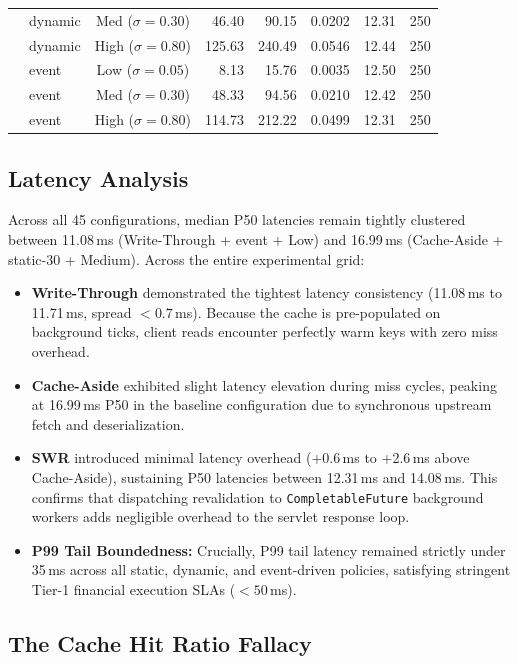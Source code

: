 \documentclass[11pt,a4paper]{article}
\begin{document}
\begin{small}
\begin{longtable}{llcrrrrr}
  & dynamic   & Med ($\sigma=0.30$)    &  46.40 &  90.15 & 0.0202 & 12.31 & 250 \\
  & dynamic   & High ($\sigma=0.80$)   & 125.63 & 240.49 & 0.0546 & 12.44 & 250 \\
  & event     & Low ($\sigma=0.05$)    &   8.13 &  15.76 & 0.0035 & 12.50 & 250 \\
  & event     & Med ($\sigma=0.30$)    &  48.33 &  94.56 & 0.0210 & 12.42 & 250 \\
  & event     & High ($\sigma=0.80$)   & 114.73 & 212.22 & 0.0499 & 12.31 & 250 \\
\end{longtable}
\end{small}

\subsection{Latency Analysis}

Across all 45 configurations, median P50 latencies remain tightly clustered between 11.08\,ms (Write-Through + event + Low) and 16.99\,ms (Cache-Aside + static-30 + Medium). Across the entire experimental grid:
\begin{itemize}
  \item \textbf{Write-Through} demonstrated the tightest latency consistency (11.08\,ms to 11.71\,ms, spread $< 0.7$\,ms). Because the cache is pre-populated on background ticks, client reads encounter perfectly warm keys with zero miss overhead.
  \item \textbf{Cache-Aside} exhibited slight latency elevation during miss cycles, peaking at 16.99\,ms P50 in the baseline configuration due to synchronous upstream fetch and deserialization.
  \item \textbf{SWR} introduced minimal latency overhead (+0.6\,ms to +2.6\,ms above Cache-Aside), sustaining P50 latencies between 12.31\,ms and 14.08\,ms. This confirms that dispatching revalidation to \texttt{CompletableFuture} background workers adds negligible overhead to the servlet response loop.
  \item \textbf{P99 Tail Boundedness:} Crucially, P99 tail latency remained strictly under 35\,ms across all static, dynamic, and event-driven policies, satisfying stringent Tier-1 financial execution SLAs ($< 50$\,ms).
\end{itemize}

\subsection{The Cache Hit Ratio Fallacy}
\end{document}
